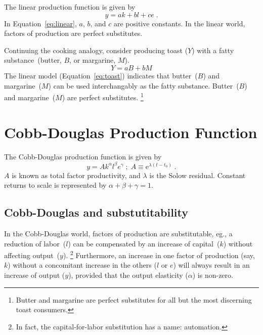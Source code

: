 \documentclass[preprint,authoryear,12pt]{elsarticle}
\begin{document}
The linear production function is given by
%
\begin{equation} \label{eq:linear}
  y = a k + b l + c e \; .
\end{equation}
%
In Equation~\ref{eq:linear}, $a$, $b$, and $c$ are positive constants.
In the linear world, factors of production are perfect substitutes.

Continuing the cooking analogy, consider producing toast ($Y$) 
with a fatty substance~(butter, $B$, or margarine, $M$).
%
\begin{equation} \label{eq:toast}
  Y = a B + b M
\end{equation}
%
The linear model (Equation~\ref{eq:toast}) indicates that butter~($B$) and margarine~($M$) 
can be used interchangably as the fatty substance.
Butter~($B$) and margarine~($M$) are perfect substitutes.%
  \footnote{
  Butter and margarine are perfect substitutes for all but the most discerning toast consumers.
  }%



\section{Cobb-Douglas Production Function} 
\label{sec:CD}

The Cobb-Douglas production function is given by
%
\begin{equation} \label{eq:CD}
  y = A k^\alpha l^\beta e^\gamma \; ; \; A \equiv \mathrm{e}^{\lambda(t-t_0)} \; .
\end{equation}
%
$A$ is known as total factor productivity,
and $\lambda$ is the Solow residual.
Constant returns to scale is represented by $\alpha + \beta + \gamma = 1$.


\subsection{Cobb-Douglas and substutitability} 
\label{sec:CD-substitution}

In the Cobb-Douglas world, factors of production are substitutable, 
eg., a reduction of labor~($l$) can be compensated by an increase of capital~($k$)
without affecting output~($y$).%
  \footnote{
  In fact, the capital-for-labor substitution has a name: automation.
  }
Furthermore, an increase in one factor of production (say, $k$)
without a concomitant increase in the others ($l$ or $e$) 
will always result in an increase of output ($y$), provided that the output elasticity 
($\alpha$) is non-zero.
\end{document}

